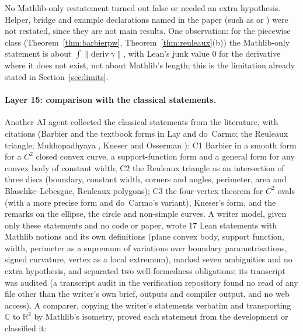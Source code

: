 \documentclass[11pt]{article}
\theoremstyle{definition}
\theoremstyle{remark}
\newcommand{\RR}{\mathbb{R}}
\newcommand{\CC}{\mathbb{C}}
\begin{document}
No Mathlib-only restatement turned out false or needed an extra hypothesis. Helper, bridge and example
declarations named in the paper (such as  or
) were not restated, since they are not main results. One
observation: for the piecewise class (Theorem~\ref{thm:barbierpw}, Theorem~\ref{thm:reuleaux}(b)) the
Mathlib-only statement is about $\int\lVert\mathrm{deriv}\,\gamma\rVert$, with Lean's junk value $0$
for the derivative where it does not exist, not about Mathlib's length; this is the limitation already
stated in Section~\ref{sec:limits}.

\paragraph{Layer 15: comparison with the classical statements.} Another AI agent collected the
classical statements from the literature, with citations (Barbier \cite{barbier1860} and the
textbook forms in Lay and do~Carmo; the Reuleaux triangle; Mukhopadhyaya \cite{mukhopadhyaya1909},
Kneser \cite{kneser1912} and Osserman \cite{osserman1985}): C1 Barbier in a smooth form for a $C^2$
closed convex curve, a support-function form and a general form for any convex body of constant
width; C2 the Reuleaux triangle as an intersection of three discs (boundary, constant width, corners
and angles, perimeter, area and Blaschke--Lebesgue, Reuleaux polygons); C3 the four-vertex theorem for
$C^2$ ovals (with a more precise form and do~Carmo's variant), Kneser's form, and the remarks on the
ellipse, the circle and non-simple curves. A writer model, given only these statements and no code or
paper, wrote 17 Lean statements with Mathlib notions and its own definitions (plane convex body,
support function, width, perimeter as a supremum of variations over boundary parametrisations,
signed curvature, vertex as a local extremum), marked seven ambiguities and no extra hypothesis, and
separated two well-formedness obligations; its transcript was audited (a transcript audit in the verification
repository found no read of any file other than the writer's own brief, outputs and compiler output, and no web access). A comparer, copying the
writer's statements verbatim and transporting $\CC$ to $\RR^2$ by Mathlib's isometry, proved each
statement from the development or classified it:
\end{document}
